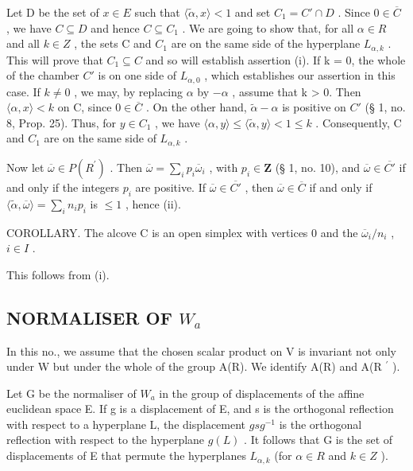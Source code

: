 Let D be the set of \(x \in E\) such that \(\langle\tilde{\alpha}, x\rangle < 1\) and set \(C_{1} = C' \cap D\) . Since \(0 \in \overline{C}\) , we have \(C \subseteq D\) and hence \(C \subseteq C_{1}\) . We are going to show that, for all \(\alpha \in R\) and all \(k \in Z\) , the sets C and \(C_{1}\) are on the same side of the hyperplane \(L_{\alpha,k}\) . This will prove that \(C_{1} \subseteq C\) and so will establish assertion (i). If k = 0, the whole of the chamber \(C'\) is on one side of \(L_{\alpha,0}\) , which establishes our assertion in this case. If \(k \neq 0\) , we may, by replacing \(\alpha\) by \(-\alpha\) , assume that k \textgreater{} 0. Then \(\langle\alpha, x\rangle < k\) on C, since \(0 \in \overline{C}\) . On the other hand, \(\tilde{\alpha} - \alpha\) is positive on \(C'\) (§ 1, no. 8, Prop. 25). Thus, for \(y \in C_{1}\) , we have \(\langle\alpha, y\rangle \leqslant \langle\tilde{\alpha}, y\rangle < 1 \leqslant k\) . Consequently, C and \(C_{1}\) are on the same side of \(L_{\alpha,k}\) .

Now let \(\overline{\omega} \in P(R^{\prime})\) . Then \(\overline{\omega} = \sum_{i} p_i \overline{\omega}_i\) , with \(p_i \in \mathbf{Z}\) (§ 1, no. 10), and \(\overline{\omega} \in \overline{C'}\) if and only if the integers \(p_i\) are positive. If \(\overline{\omega} \in \overline{C'}\) , then \(\overline{\omega} \in \overline{C}\) if and only if \(\langle \tilde{\alpha}, \overline{\omega} \rangle = \sum_{i} n_i p_i\) is \(\leqslant 1\) , hence (ii).

COROLLARY. The alcove C is an open simplex with vertices 0 and the \(\overline{\omega}_i / n_i\) , \(i \in I\) .

This follows from (i).

\subsection{\texorpdfstring{NORMALISER OF \(W_{a}\)}{NORMALISER OF W\_a}}

In this no., we assume that the chosen scalar product on V is invariant not only under W but under the whole of the group A(R). We identify A(R) and A(R \(^{\prime}\) ).

Let G be the normaliser of \(W_{a}\) in the group of displacements of the affine euclidean space E. If g is a displacement of E, and s is the orthogonal reflection with respect to a hyperplane L, the displacement \(gsg^{-1}\) is the orthogonal reflection with respect to the hyperplane \(g(L)\) . It follows that G is the set of displacements of E that permute the hyperplanes \(L_{\alpha,k}\) (for \(\alpha \in R\) and \(k \in Z\) ).

